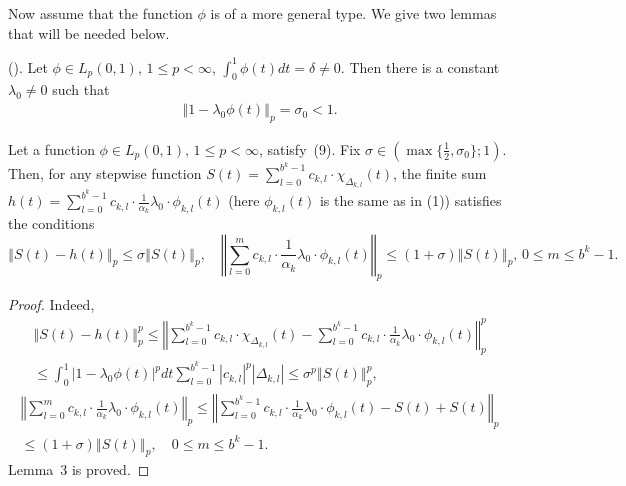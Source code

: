 \documentclass[
11pt,%
tightenlines,%
twoside,%
onecolumn,%
nofloats,%
nobibnotes,%
nofootinbib,%
superscriptaddress,%
noshowpacs,%
centertags]%
{revtex4}
\begin{document}
Now assume that the function $\phi$ is of a more general type. We
give two lemmas that will be needed below.
\\
\begin{lemma} %
 (\cite{fo}).   Let $\phi\in L_p(0,1), \, 1
    \leq p< \infty,\,   \int_{0}^{1} \phi(t)dt=\delta\neq 0  $.  Then
    there is a constant $\lambda_0 \not= 0$ such that
    \begin{eqnarray}
        \left\Vert 1- \lambda_0 \phi(t) \right\Vert_p = \sigma_0   <1.
\end{eqnarray}
\end{lemma}
\begin{lemma} %
  Let a function $\phi\in L_p(0,1), \, 1
    \leq p< \infty $,
    satisfy~(9). Fix  $\sigma \in (\max\{ \frac{1}{2}, \sigma_0\};1)$.
    Then, for any stepwise function
    $S(t)=\sum_{l=0}^{b^k-1} c_{k,l} \cdot \chi_{\Delta_{k,l}}(t)$,
    the finite sum $h(t)= \sum_{l=0}^{b^k-1} c_{k,l}\cdot
    \frac{1}{\alpha_k} \lambda_0 \cdot \phi_{k,l}(t)$ (here  $
    \phi_{k,l}(t) $ is the same as in (1)) %
    satisfies the
    conditions
    $$
    \left\Vert S(t)  - h(t) \right\Vert_p \le \sigma \left\Vert S(t)
    \right\Vert_p,\quad
    \left\Vert \sum_{l=0}^{m} c_{k,l}\cdot \frac{1}{\alpha_k}
    \lambda_0  \cdot \phi_{k,l}(t) \right\Vert_p \le (1+\sigma)
    \left\Vert S(t) \right\Vert_p, \, 0\le m \le b^k -1.
    $$
\end{lemma}
\begin{proof}  Indeed,
\begin{multline*}
    \left\Vert S(t)  - h(t) \right\Vert_p^p \le \left\Vert \sum_{l=0}^{b^k-1} c_{k,l} \cdot \chi_{\Delta_{k,l}}(t)
    - \sum_{l=0}^{b^k-1} c_{k,l}\cdot \frac{1}{\alpha_k} \lambda_0 \cdot \phi_{k,l}(t)\right\Vert_p^p
    \\
    \le\int_{0}^{1} |1- \lambda_0 \phi(t)|^pdt \sum_{l=0}^{b^k
        -1}|c_{k,l}|^p  |\Delta_{k,l}|\le \sigma^p \left\Vert S(t)
    \right\Vert_p^p,
\end{multline*}
\begin{multline*}
    \left\Vert \sum_{l=0}^{m} c_{k,l}\cdot \frac{1}{\alpha_k}
    \lambda_0  \cdot \phi_{k,l}(t) \right\Vert_p \le\left\Vert
    \sum_{l=0}^{b^k-1} c_{k,l}\cdot \frac{1}{\alpha_k} \lambda_0 \cdot
    \phi_{k,l}(t) -S(t) +S(t)  \right\Vert_p
    \\
    \le(1+\sigma) \left\Vert S(t) \right\Vert_p, \quad 0\le m \le b^k
    -1.
\end{multline*}
Lemma~3 is proved.
\end{proof}
\smallskip
\end{document}
